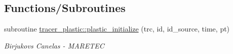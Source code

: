 \subsection*{Functions/\+Subroutines}
\begin{DoxyCompactItemize}
\item 
subroutine \hyperlink{namespacetracer__plastic_a9a4e16b71bcd88b95c80ddb9c3ddb7d1}{tracer\+\_\+plastic\+::plastic\+\_\+initialize} (trc, id, id\+\_\+source, time, pt)
\begin{DoxyCompactList}\small\item\em Birjukovs Canelas -\/ M\+A\+R\+E\+T\+EC \end{DoxyCompactList}\end{DoxyCompactItemize}
